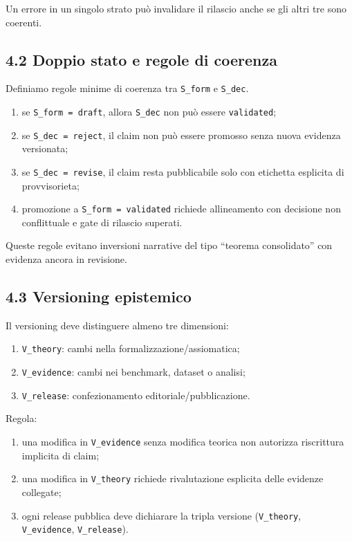 Un errore in un singolo strato può invalidare il rilascio anche se gli altri tre sono coerenti.

\subsection{4.2 Doppio stato e regole di coerenza}

Definiamo regole minime di coerenza tra \texttt{S\_form} e \texttt{S\_dec}.

\begin{enumerate}
\def\labelenumi{\arabic{enumi}.}
\tightlist
\item
  se \texttt{S\_form\ =\ draft}, allora \texttt{S\_dec} non può essere \texttt{validated};
\item
  se \texttt{S\_dec\ =\ reject}, il claim non può essere promosso senza nuova evidenza versionata;
\item
  se \texttt{S\_dec\ =\ revise}, il claim resta pubblicabile solo con etichetta esplicita di provvisorieta;
\item
  promozione a \texttt{S\_form\ =\ validated} richiede allineamento con decisione non conflittuale e gate di rilascio superati.
\end{enumerate}

Queste regole evitano inversioni narrative del tipo ``teorema consolidato'' con evidenza ancora in revisione.

\subsection{4.3 Versioning epistemico}

Il versioning deve distinguere almeno tre dimensioni:

\begin{enumerate}
\def\labelenumi{\arabic{enumi}.}
\tightlist
\item
  \texttt{V\_theory}: cambi nella formalizzazione/assiomatica;
\item
  \texttt{V\_evidence}: cambi nei benchmark, dataset o analisi;
\item
  \texttt{V\_release}: confezionamento editoriale/pubblicazione.
\end{enumerate}

Regola:

\begin{enumerate}
\def\labelenumi{\arabic{enumi}.}
\tightlist
\item
  una modifica in \texttt{V\_evidence} senza modifica teorica non autorizza riscrittura implicita di claim;
\item
  una modifica in \texttt{V\_theory} richiede rivalutazione esplicita delle evidenze collegate;
\item
  ogni release pubblica deve dichiarare la tripla versione (\texttt{V\_theory}, \texttt{V\_evidence}, \texttt{V\_release}).
\end{enumerate}

